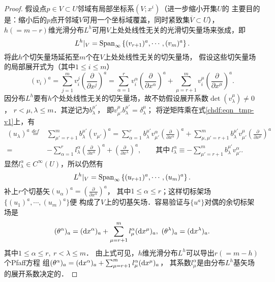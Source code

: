 \begin{proof}
假设点$p\in V\subset U$邻域有局部坐标系$(V;x^i)$（进一步缩小开集$U$的
主要目的是：缩小后的$p$点开邻域$V$可用一个坐标域覆盖，同时紧致集$\overline{V}\subset U$），
$h(=m-r)$维光滑分布$L^h$可用$V$上处处线性无关的光滑切矢量场来张成，即
\begin{equation}
    L^h|_V = {\rm Span}_{\infty} \left\{(v_{r+1})^a,\cdots, (v_m)^a \right\}.
\end{equation}
将此$h$个切矢量场延拓至$m$个在$V$上处处线性无关的切矢量场，
假设这些切矢量场的局部展开式为（其中$1\leqslant i\leqslant m$）
\begin{equation}\label{chdf:eqn_tmp-v1}
    (v_i)^a= \sum_{j=1}^{m} v_i^j \left(\frac{\partial}{\partial x^j}\right)^a
    =\sum_{\alpha=1}^{r}v_i^\alpha \left(\frac{\partial}{\partial x^\alpha}\right)^a
    +\sum_{\mu=r+1}^{m}v_i^\mu \left(\frac{\partial}{\partial x^\mu}\right)^a .
\end{equation}
因分布$L^h$要有$h$个处处线性无关的切矢量场，故不妨假设展开系数$\det(v_\lambda^\mu)\neq 0$，
$r< \mu,\lambda \leqslant m$．其逆记为$b_\lambda^{\mu'}$，
即$v^\mu_{\mu'} b_\lambda^{\mu'} =\delta^\mu_\lambda$；
将逆矩阵乘在式\eqref{chdf:eqn_tmp-v1}上，有
\begin{align*}
    (u_\lambda)^a \overset{def}{=}&  \sum_{\mu'=r+1}^{m} b_\lambda^{\mu'} (v_{\mu'})^a
    =\sum_{\alpha=1}^{r} b_\lambda^{\mu'} v_{\mu'}^\alpha \left(\frac{\partial}{\partial x^\alpha}\right)^a
    +\sum_{\mu,{\mu'}=r+1}^{m} b_\lambda^{\mu'} v_{\mu'}^\mu
        \left(\frac{\partial}{\partial x^\mu}\right)^a   \\
    =&-\sum_{\alpha=1}^{r} l_\lambda^{\alpha} \left(\frac{\partial}{\partial x^\alpha}\right)^a
    + \left(\frac{\partial}{\partial x^\lambda}\right)^a ,
    \qquad \text{其中}\ l_\lambda^{\alpha} 
   \equiv - \sum_{\mu'=r+1}^{m}b_\lambda^{\mu'} v_{\mu'}^\alpha .
\end{align*}
显然$l_\lambda^{\alpha} \in C^\infty(U)$，所以仍然有
\begin{equation}
    L^h|_V = {\rm Span}_{\infty} \left\{(u_{r+1})^a,\cdots, (u_m)^a \right\}.
\end{equation}
补上$r$个切基矢$(u_\alpha)^a= \left(\frac{\partial}{\partial x^\alpha}\right)^a$，
其中$1\leqslant \alpha \leqslant r$；这样切标架场$\{ (u_{1})^a,\cdots, (u_m)^a \}$便
构成了$V$上的切基矢场．容易验证与$\{u^a\}$对偶的余切标架场是
\begin{equation}
    (\theta^\alpha)_a =  ({\rm d}x^\alpha)_a + \sum_{\mu=r+1}^{m} l^\alpha_\mu ({\rm d}x^\mu)_a  ,
    \   (\theta^\lambda)_a = ({\rm d}x^\lambda)_a.  
\end{equation}
其中$1 \leqslant \alpha \leqslant r,\ r<\lambda\leqslant m$．
由上式可见，$h$维光滑分布$L^h$可以导出$r(=m-h)$个Pfaff方程
组$(\theta^\alpha)_a =  ({\rm d}x^\alpha)_a + \sum_{\mu=r+1}^{m} l^\alpha_\mu ({\rm d}x^\mu)_a $，
其系数$l^\alpha_\mu$是由分布$L^h$基矢场的展开系数决定的．


\end{proof}

